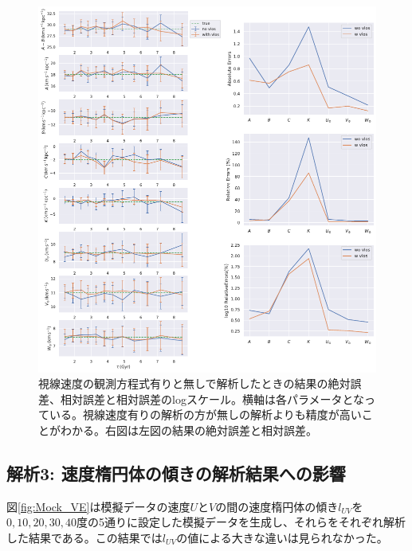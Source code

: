 \begin{figure}[htbp]
	\centering
	\includegraphics[width=15cm]{fig/Mock_vlos.pdf}
	\caption{視線速度の観測方程式有りと無しで解析したときの結果の絶対誤差、相対誤差と相対誤差のlogスケール。横軸は各パラメータとなっている。視線速度有りの解析の方が無しの解析よりも精度が高いことがわかる。右図は左図の結果の絶対誤差と相対誤差。} \label{fig:Mock_vlos}
\end{figure}


\subsection{解析3: 速度楕円体の傾きの解析結果への影響}
図\ref{fig:Mock_VE}は模擬データの速度$U$と$V$の間の速度楕円体の傾き$l_{UV}$を$0,10,20,30,40$度の5通りに設定した模擬データを生成し、それらをそれぞれ解析した結果である。この結果では$l_{UV}$の値による大きな違いは見られなかった。

